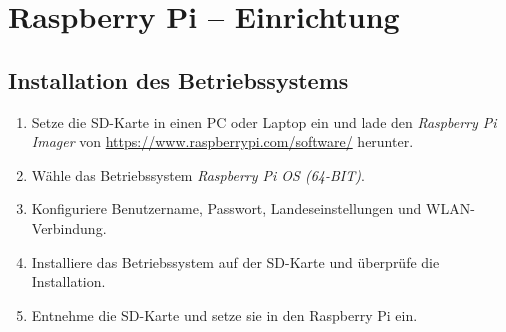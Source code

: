 \documentclass[a4paper,12pt]{article}
\begin{document}
\section{Raspberry Pi – Einrichtung}
\subsection{Installation des Betriebssystems}
\begin{enumerate}
    \item Setze die SD-Karte in einen PC oder Laptop ein und lade den \textit{Raspberry Pi Imager} von \url{https://www.raspberrypi.com/software/} herunter.
    \item Wähle das Betriebssystem \textit{Raspberry Pi OS (64-BIT)}.
    \item Konfiguriere Benutzername, Passwort, Landeseinstellungen und WLAN-Verbindung.
    \item Installiere das Betriebssystem auf der SD-Karte und überprüfe die Installation.
    \item Entnehme die SD-Karte und setze sie in den Raspberry Pi ein.
\end{enumerate}
\end{document}
